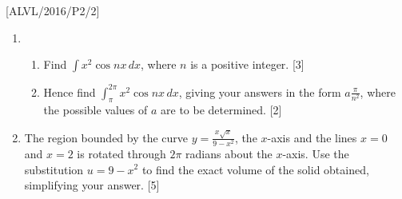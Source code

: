 \item {[}ALVL/2016/P2/2{]}
\begin{enumerate}
\item {}
\begin{enumerate}
\item Find $\int x^{2}\cos nx\,dx$, where $n$ is a positive integer. \hfill{}{[}3{]}
\item Hence find $\int_{\pi}^{2\pi}x^{2}\cos nx\,dx$, giving your answers
in the form $a\frac{\pi}{n^{2}}$, where the possible values of $a$
are to be determined. \hfill{}{[}2{]}
\end{enumerate}
\item The region bounded by the curve $y=\frac{x\sqrt{x}}{9-x^{2}}$, the
$x$-axis and the lines $x=0$ and $x=2$ is rotated through $2\pi$
radians about the $x$-axis. Use the substitution $u=9-x^{2}$ to
find the exact volume of the solid obtained, simplifying your answer.
\hfill{}{[}5{]}
\end{enumerate}

